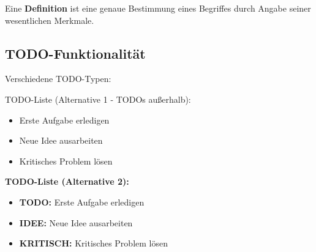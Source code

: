 \documentclass[../main.tex]{subfiles}
\begin{document}
\begin{definition}
Eine \textbf{Definition} ist eine genaue Bestimmung eines Begriffes durch Angabe seiner wesentlichen Merkmale.
\end{definition}


\subsection{TODO-Funktionalität}

Verschiedene TODO-Typen:

TODO-Liste (Alternative 1 - TODOs außerhalb):
\begin{itemize}
    \item Erste Aufgabe erledigen
    \item Neue Idee ausarbeiten
    \item Kritisches Problem lösen
\end{itemize}

\textbf{TODO-Liste (Alternative 2):}
\begin{itemize}
    \item \textbf{TODO:} Erste Aufgabe erledigen
    \item \textbf{IDEE:} Neue Idee ausarbeiten  
    \item \textbf{KRITISCH:} Kritisches Problem lösen
\end{itemize}


\end{document}
